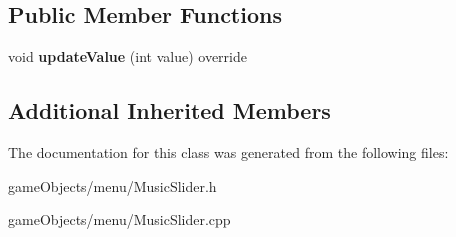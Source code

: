 \subsection*{Public Member Functions}
\begin{DoxyCompactItemize}
\item 
\hypertarget{class_music_slider_ab4f10b03814686c9f57c9e63b516791c}{void {\bfseries update\+Value} (int value) override}\label{class_music_slider_ab4f10b03814686c9f57c9e63b516791c}

\end{DoxyCompactItemize}
\subsection*{Additional Inherited Members}


The documentation for this class was generated from the following files\+:\begin{DoxyCompactItemize}
\item 
game\+Objects/menu/Music\+Slider.\+h\item 
game\+Objects/menu/Music\+Slider.\+cpp\end{DoxyCompactItemize}
